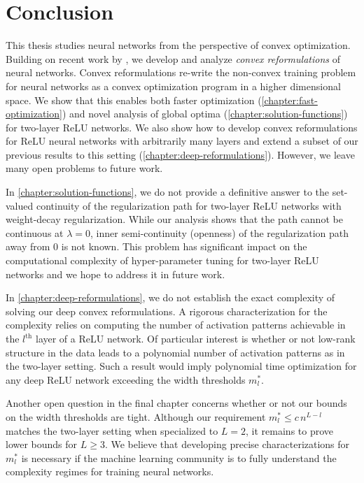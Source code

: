 
\chapter{Conclusion}\label{chapter:conclusion}

This thesis studies neural networks from the perspective of convex
optimization.
Building on recent work by \citet{pilanci2020convexnn}, we develop and
analyze \emph{convex reformulations} of neural networks.
Convex reformulations re-write the non-convex training problem for neural
networks as a convex optimization program in a higher dimensional space.
We show that this enables both faster optimization
(\cref{chapter:fast-optimization}) and novel analysis of global optima
(\cref{chapter:solution-functions}) for two-layer ReLU networks.
We also show how to develop convex reformulations for ReLU neural networks
with arbitrarily many layers and extend a subset of our previous results
to this setting (\cref{chapter:deep-reformulations}).
However, we leave many open problems to future work.

In \cref{chapter:solution-functions}, we do not provide a definitive answer
to the set-valued continuity of the regularization path for two-layer ReLU
networks with weight-decay regularization.
While our analysis shows that the path cannot be continuous at \( \lambda = 0 \),
inner semi-continuity (openness) of the regularization path away
from \( 0 \) is not known.
This problem has significant impact on the computational complexity of
hyper-parameter tuning for two-layer ReLU networks and we hope to address
it in future work.

In \cref{chapter:deep-reformulations}, we do not establish the exact complexity
of solving our deep convex reformulations.
A rigorous characterization for the complexity relies on computing the number
of activation patterns achievable in the \( l^{\text{th}} \) layer of a ReLU
network.
Of particular interest is whether or not low-rank structure in the data
leads to a polynomial number of activation patterns as in the two-layer
setting.
Such a result would imply polynomial time optimization for any deep ReLU
network exceeding the width thresholds \( m^*_l \).

Another open question in the final chapter concerns whether or not our bounds
on the width thresholds are tight.
Although our requirement \( m^*_{l} \leq c \, n^{L - l} \) matches the
two-layer setting when specialized to \( L = 2 \),
it remains to prove lower bounds for \( L \geq 3 \).
We believe that developing precise characterizations for \( m_l^* \) is
necessary if the machine learning community is to fully understand the
complexity regimes for training neural networks.

